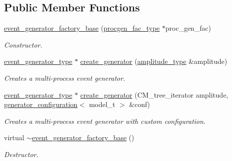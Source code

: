 \subsection*{Public Member Functions}
\begin{DoxyCompactItemize}
\item 
\hypertarget{a00214_ac9f51d2d0d13d342106dc9df13b78d58}{}\hyperlink{a00214_ac9f51d2d0d13d342106dc9df13b78d58}{event\+\_\+generator\+\_\+factory\+\_\+base} (\hyperlink{a00438}{procgen\+\_\+fac\+\_\+type} $\ast$proc\+\_\+gen\+\_\+fac)\label{a00214_ac9f51d2d0d13d342106dc9df13b78d58}

\begin{DoxyCompactList}\small\item\em Constructor. \end{DoxyCompactList}\item 
\hypertarget{a00214_a703621e7f685bac4bd74920ca6e82003}{}\hyperlink{a00212}{event\+\_\+generator\+\_\+type} $\ast$ \hyperlink{a00214_a703621e7f685bac4bd74920ca6e82003}{create\+\_\+generator} (\hyperlink{a00065}{amplitude\+\_\+type} \&amplitude)\label{a00214_a703621e7f685bac4bd74920ca6e82003}

\begin{DoxyCompactList}\small\item\em Creates a multi-\/process event generator. \end{DoxyCompactList}\item 
\hyperlink{a00212}{event\+\_\+generator\+\_\+type} $\ast$ \hyperlink{a00214_a8e564926e7617a84d2ada9486c506e1e}{create\+\_\+generator} (C\+M\+\_\+tree\+\_\+iterator amplitude, \hyperlink{a00241}{generator\+\_\+configuration}$<$ model\+\_\+t $>$ \&conf)
\begin{DoxyCompactList}\small\item\em Creates a multi-\/process event generator with custom configuration. \end{DoxyCompactList}\item 
\hypertarget{a00214_ad8b120d7b6f5edb86333c0a13715175e}{}virtual \hyperlink{a00214_ad8b120d7b6f5edb86333c0a13715175e}{$\sim$event\+\_\+generator\+\_\+factory\+\_\+base} ()\label{a00214_ad8b120d7b6f5edb86333c0a13715175e}

\begin{DoxyCompactList}\small\item\em Destructor. \end{DoxyCompactList}\end{DoxyCompactItemize}
